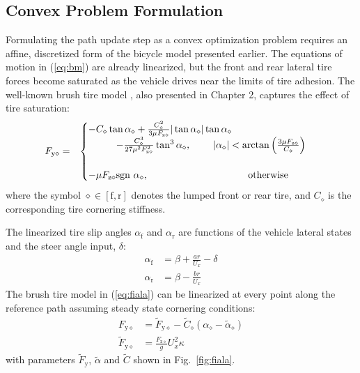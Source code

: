 \subsection{Convex Problem Formulation}

Formulating the path update step as a convex optimization problem requires an affine, discretized form of the
bicycle model presented earlier. The equations of motion in (\ref{eq:bm}) are already linearized, but
 the front and rear lateral tire forces become saturated as the vehicle drives near the limits of tire adhesion. 
The well-known brush tire model \cite{Pacejka2012}, also presented in Chapter 2, captures the effect of tire saturation:
\begin{eqnarray}
\label{eq:fiala}
	F_\mathrm{y\diamond}&=&\begin{cases} -C_{\diamond}\tan\alpha_\diamond + \frac{C_\diamond^2}{3\mu F_\mathrm{z\diamond}} |\tan\alpha_\diamond| \tan\alpha_\diamond \\ \hspace{10mm}- \frac{C_\diamond^3}{27\mu^2F_\mathrm{z\diamond}^2}\tan^3\alpha_\diamond,
\hspace{8mm}  |\alpha_\diamond| < \arctan{\left(\frac{3\mu F_\mathrm{z\diamond}}{C_\diamond}\right)} \\ \\ -\mu F_\mathrm{z\diamond}\text{sgn} \ \alpha_\diamond, \hspace{36mm} \mathrm{otherwise} \end{cases}
\end{eqnarray}
where the symbol $\diamond \in [\mathrm{f},\mathrm{r}]$ denotes the lumped front or rear tire, and $C_\diamond$ is the corresponding tire cornering stiffness. 

\newpage
The linearized tire slip angles $\alpha_\mathrm{f}$ and $\alpha_\mathrm{r}$ are functions of the vehicle lateral states and the steer angle
input, $\delta$:
\begin{subequations}
\begin{align}
	\alpha_\mathrm{f} &= \beta + \frac{ar}{U_x} - \delta\\
	\alpha_\mathrm{r} &= \beta - \frac{br}{U_x}
\end{align}
\end{subequations}
The brush tire model in (\ref{eq:fiala}) can be linearized at every point along the reference path assuming steady state cornering conditions:
\begin{subequations}
\begin{align}
	F_\mathrm{y\diamond} &= \tilde{F}_\mathrm{y\diamond} - \tilde{C}_\diamond(\alpha_\diamond - \tilde{\alpha}_\diamond) \\
	\tilde{F}_\mathrm{y\diamond} &= \frac{F_\mathrm{z\diamond}}{g} U_x^2\kappa
\label{eqn:ftil}
\end{align}
\end{subequations}
with parameters $\tilde{F}_\mathrm{y}$, $\tilde{\alpha}$ and $\tilde{C}$ shown in Fig.~\ref{fig:fiala}. 

